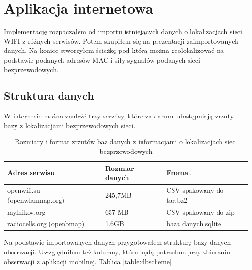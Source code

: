 \section{Aplikacja internetowa}
Implementację rozpocząłem od importu istniejących danych o lokalizacjach sieci WIFI z różnych serwisów. Potem skupiłem się na prezentacji zaimportowanych danych. Na koniec stworzyłem ścieżkę pod którą można geolokalizować na podstawie podanych adresów MAC i siły sygnałów podanych sieci bezprzewodowych.

\subsection{Struktura danych}
W internecie można znaleźć trzy serwisy, które za darmo udostępniają zrzuty bazy z lokalizacjami bezprzewodowych sieci.

\begin{table}
\caption{Rozmiary i format zrzutów baz danych z informacjami o lokalizacjach sieci bezprzewodowych}
\label{table:wifilocationdatabases}
\begin{tabular}{ |l|l|l|  }
\hline
Adres serwisu & Rozmiar danych & Fromat \\
\hline
\hline
openwifi.su (openwlanmap.org) & 245,7MB & CSV spakowany do tar.bz2 \\
\hline
mylnikov.org & 657 MB & CSV spakowany do zip \\
\hline
radiocells.org (openbmap) & 1.6GB & baza danych sqlite \\
\hline
\end{tabular}
\end{table}

Na podstawie importowanych danych przygotowałem strukturę bazy danych obserwacji. Uwzględniłem też kolumny, które będą potrzebne przy zbieraniu obserwacji z aplikacji mobilnej. Tablica \ref{table:dbscheme}

